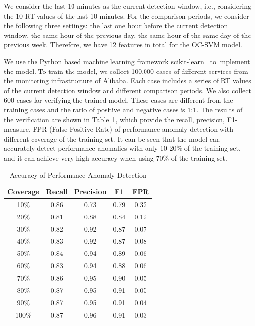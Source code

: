 We consider the last 10 minutes as the current detection window, i.e., considering the 10 RT values of the last 10 minutes.
For the comparison periods, we consider the following three settings: the last one hour before the current detection window, the same hour of the previous day, the same hour of the same day of the previous week.
Therefore, we have 12 features in total for the OC-SVM model.

We use the Python based machine learning framework scikit-learn~\cite{scikitLearn} to implement the model.
To train the model, we collect 100,000 cases of different services from the monitoring infrastructure of Alibaba.
Each case includes a series of RT values of the current detection window and different comparison periods.
We also collect 600 cases for verifying the trained model. 
These cases are different from the training cases and the ratio of positive and negative cases is 1:1.
The results of the verification are shown in Table~\ref{tab:performance_train}, which provide the recall, precision,
F1-measure, FPR (False Positive Rate) of performance anomaly detection with different coverage of the training set.
It can be seen that the model can accurately detect performance anomalies with only 10-20\% of the training set, and it can achieve very high accuracy when using 70\% of the training set.

\begin{table}[ht]
	\newcommand{\tabincell}[2]{\begin{tabular}{@{}#1@{}}#2\end{tabular}}
	\caption{Accuracy of Performance Anomaly Detection}
	\label{tab:performance_train}
    \small
	\centering
		\begin{tabular}{|c|c|c|c|c|}
			\hline \textbf{Coverage} & \textbf{Recall} & \textbf{Precision} & \textbf{F1} & \textbf{FPR}\\
			\hline 10\%  &  0.86 & 0.73 & 0.79 & 0.32 \\
			\hline 20\%  &  0.81 & 0.88 & 0.84 & 0.12 \\
            \hline 30\%  &  0.82 & 0.92 & 0.87 & 0.07 \\
			\hline 40\%  &  0.83 & 0.92 & 0.87 & 0.08 \\
			\hline 50\%  &  0.84 & 0.94 & 0.89 & 0.06 \\
            \hline 60\%  &  0.83 & 0.94 & 0.88 & 0.06 \\
			\hline 70\%  &  0.86 & 0.95 & 0.90 & 0.05 \\
			\hline 80\%  &  0.87 & 0.95 & 0.91 & 0.05 \\
            \hline 90\%  &  0.87 & 0.95 & 0.91 & 0.04 \\
            \hline 100\% &  0.87 & 0.96 & 0.91 & 0.03 \\
			\hline
		\end{tabular}
	\vspace{-3pt}
\end{table}

